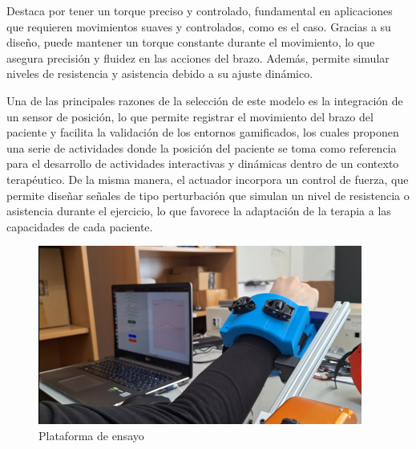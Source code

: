 Destaca por tener un torque preciso y controlado, fundamental en aplicaciones que requieren movimientos suaves y controlados, como es el caso.
Gracias a su diseño, puede mantener un torque constante durante el movimiento, lo que asegura precisión y fluidez en las acciones del brazo.
Además, permite simular niveles de resistencia y asistencia debido a su ajuste dinámico.

Una de las principales razones de la selección de este modelo es la integración de un sensor de posición, lo que permite registrar el movimiento del brazo del paciente y facilita la validación de los entornos gamificados, los cuales proponen una serie de actividades donde la posición del paciente se toma como referencia para el desarrollo de actividades interactivas y dinámicas dentro de un contexto terapéutico.
De la misma manera, el actuador incorpora un control de fuerza, que permite diseñar señales de tipo perturbación que simulan un nivel de resistencia o asistencia durante el ejercicio, lo que favorece la adaptación de la terapia a las capacidades de cada paciente.

\begin{figure}[ht!]
	\centering
	\begin{minipage}{0.85\linewidth}
		\centering
		\includegraphics[width=\linewidth]{figs/ensayo.png}
	\end{minipage}
	\caption[Plataforma de ensayo]{Plataforma de ensayo}
	\label{fig:actuador}
\end{figure}

